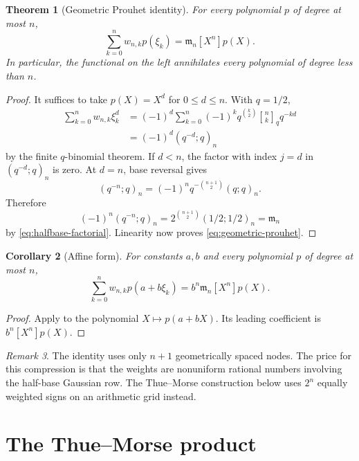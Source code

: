 \documentclass[11pt,oneside,openany]{book}
\newtheorem{theorem}{Theorem}[chapter]
\newtheorem{corollary}[theorem]{Corollary}
\theoremstyle{definition}
\theoremstyle{remark}
\newtheorem{remark}[theorem]{Remark}
\newcommand{\Qbinom}[3]{\genfrac{[}{]}{0pt}{}{#1}{#2}_{#3}}
\begin{document}
\begin{theorem}[Geometric Prouhet identity]\label{thm:geometric-prouhet}
For every polynomial $p$ of degree at most $n$,
\begin{equation}\label{eq:geometric-prouhet}
 \sum_{k=0}^{n}w_{n,k}p(\xi_k)
 =\mathfrak m_n[X^n]p(X).
\end{equation}
In particular, the functional on the left annihilates every polynomial of degree less than $n$.
\end{theorem}

\begin{proof}
It suffices to take $p(X)=X^d$ for $0\le d\le n$.  With $q=1/2$,
\begin{align*}
 \sum_{k=0}^{n}w_{n,k}\xi_k^d
 &=(-1)^d\sum_{k=0}^{n}(-1)^kq^{\binom k2}
   \Qbinom nkq q^{-kd}\\
 &=(-1)^d(q^{-d};q)_n
\end{align*}
by the finite $q$-binomial theorem.  If $d<n$, the factor with index $j=d$ in
$(q^{-d};q)_n$ is zero.  At $d=n$, base reversal gives
\[
 (q^{-n};q)_n=(-1)^nq^{-\binom{n+1}{2}}(q;q)_n.
\]
Therefore
\[
 (-1)^n(q^{-n};q)_n
 =2^{\binom{n+1}{2}}(1/2;1/2)_n
 =\mathfrak m_n
\]
by \eqref{eq:halfbase-factorial}.  Linearity now proves \eqref{eq:geometric-prouhet}.
\end{proof}

\begin{corollary}[Affine form]\label{cor:geometric-prouhet-affine}
For constants $a,b$ and every polynomial $p$ of degree at most $n$,
\[
 \sum_{k=0}^{n}w_{n,k}p(a+b\xi_k)
 =b^n\mathfrak m_n[X^n]p(X).
\]
\end{corollary}

\begin{proof}
Apply  to the polynomial $X\mapsto p(a+bX)$.  Its leading coefficient is $b^n[X^n]p(X)$.
\end{proof}

\begin{remark}
The identity uses only $n+1$ geometrically spaced nodes.  The price for this compression is that the weights are nonuniform rational numbers involving the half-base Gaussian row.  The Thue--Morse construction below uses $2^n$ equally weighted signs on an arithmetic grid instead.
\end{remark}

\section{The Thue--Morse product}
\end{document}

